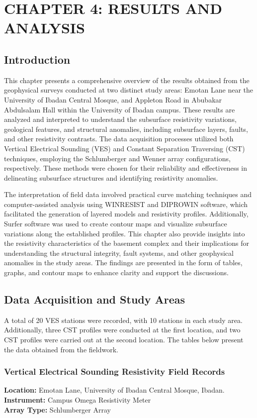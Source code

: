 \documentclass[12pt,a4paper]{report}
\begin{document}
\chapter{CHAPTER 4: RESULTS AND ANALYSIS}

\section{Introduction}
\justifying
This chapter presents a comprehensive overview of the results obtained from the geophysical surveys conducted at two distinct study areas: Emotan Lane near the University of Ibadan Central Mosque, and Appleton Road in Abubakar Abdulsalam Hall within the University of Ibadan campus. These results are analyzed and interpreted to understand the subsurface resistivity variations, geological features, and structural anomalies, including subsurface layers, faults, and other resistivity contrasts. The data acquisition processes utilized both Vertical Electrical Sounding (VES) and Constant Separation Traversing (CST) techniques, employing the Schlumberger and Wenner array configurations, respectively. These methods were chosen for their reliability and effectiveness in delineating subsurface structures and identifying resistivity anomalies.

The interpretation of field data involved practical curve matching techniques and computer-assisted analysis using WINRESIST and DIPROWIN software, which facilitated the generation of layered models and resistivity profiles. Additionally, Surfer software was used to create contour maps and visualize subsurface variations along the established profiles. This chapter also provide insights into the resistivity characteristics of the basement complex and their implications for understanding the structural integrity, fault systems, and other geophysical anomalies in the study areas. The findings are presented in the form of tables, graphs, and contour maps to enhance clarity and support the discussions.

\section{Data Acquisition and Study Areas}
A total of 20 VES stations were recorded, with 10 stations in each study area. Additionally, three CST profiles were conducted at the first location, and two CST profiles were carried out at the second location. The tables below present the data obtained from the fieldwork.

\subsection{Vertical Electrical Sounding Resistivity Field Records}
\textbf{Location:} {Emotan Lane, University of Ibadan Central Mosque, Ibadan.} \\
\textbf{Instrument:} {Campus Omega Resistivity Meter} \\
\textbf{Array Type:} {Schlumberger Array }
\end{document}
